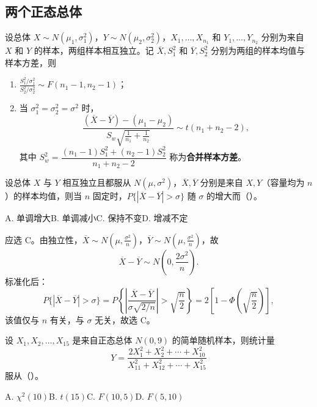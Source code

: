 \documentclass[lang=cn,11pt]{elegantbook}
\begin{document}
\subsection{两个正态总体}

\begin{theorem}[双正态总体抽样分布] \label{thm:normal-two}
设总体 \(X \sim N(\mu_1, \sigma_1^2)\)，\(Y \sim N(\mu_2, \sigma_2^2)\)，\(X_1, \dots, X_{n_1}\) 和 \(Y_1, \dots, Y_{n_2}\) 分别为来自 \(X\) 和 \(Y\) 的样本，两组样本相互独立。记 \(\overline{X}, S_1^2\) 和 \(\overline{Y}, S_2^2\) 分别为两组的样本均值与样本方差，则
\begin{enumerate}
    \item \(\displaystyle\frac{S_1^2/\sigma_1^2}{S_2^2/\sigma_2^2} \sim F(n_1-1, n_2-1)\)；
    \item 当 \(\sigma_1^2 = \sigma_2^2 = \sigma^2\) 时，
    \[
    \frac{(\overline{X}-\overline{Y})-(\mu_1-\mu_2)}{S_w\sqrt{\frac{1}{n_1}+\frac{1}{n_2}}} \sim t(n_1+n_2-2),
    \]
    其中 \(S_w^2 = \dfrac{(n_1-1)S_1^2+(n_2-1)S_2^2}{n_1+n_2-2}\) 称为\textbf{合并样本方差}。
\end{enumerate}
\end{theorem}

\begin{exercise}[样本均值差的分布] \label{ex:sampling_02}
设总体 \(X\) 与 \(Y\) 相互独立且都服从 \(N(\mu,\sigma^2)\)，\(\overline{X},\overline{Y}\) 分别是来自 \(X,Y\)（容量均为 \(n\)）的样本均值，则当 \(n\) 固定时，\(P\{|\overline{X}-\overline{Y}|>\sigma\}\) 随 \(\sigma\) 的增大而（\quad）。\par
A. 单调增大\qquad B. 单调减小\qquad C. 保持不变\qquad D. 增减不定
\end{exercise}
\begin{solution}
应选 C。由独立性，\(\overline{X}\sim N\!\left(\mu,\frac{\sigma^2}{n}\right)\)，\(\overline{Y}\sim N\!\left(\mu,\frac{\sigma^2}{n}\right)\)，故
\[
\overline{X}-\overline{Y}\sim N\!\left(0,\frac{2\sigma^2}{n}\right).
\]
标准化后：
\[
P\{|\overline{X}-\overline{Y}|>\sigma\}
= P\!\left\{\left|\frac{\overline{X}-\overline{Y}}{\sigma\sqrt{2/n}}\right|>\sqrt{\frac{n}{2}}\right\}
= 2\!\left[1-\Phi\!\left(\sqrt{\frac{n}{2}}\right)\right],
\]
该值仅与 \(n\) 有关，与 \(\sigma\) 无关，故选 C。
\end{solution}


\begin{exercise}\label{exer:6-y-f-dist}
设 \(X_1, X_2, \dots, X_{15}\) 是来自正态总体 \(N(0, 9)\) 的简单随机样本，则统计量
\[
Y = \frac{2X_1^2 + X_2^2 + \cdots + X_{10}^2}{X_{11}^2 + X_{12}^2 + \cdots + X_{15}^2}
\]
服从（\quad）。\par
A. \(\chi^2(10)\)\quad B. \(t(15)\)\quad C. \(F(10,5)\)\quad D. \(F(5,10)\)
\end{exercise}
\end{document}
